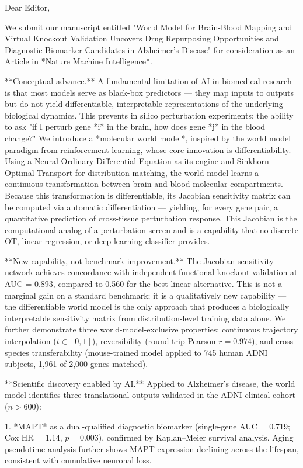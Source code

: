 Dear Editor,

We submit our manuscript entitled "World Model for Brain-Blood Mapping and Virtual Knockout Validation Uncovers Drug Repurposing Opportunities and Diagnostic Biomarker Candidates in Alzheimer's Disease" for consideration as an Article in *Nature Machine Intelligence*.

**Conceptual advance.** A fundamental limitation of AI in biomedical research is that most models serve as black-box predictors — they map inputs to outputs but do not yield differentiable, interpretable representations of the underlying biological dynamics. This prevents in silico perturbation experiments: the ability to ask "if I perturb gene *i* in the brain, how does gene *j* in the blood change?" We introduce a *molecular world model*, inspired by the world model paradigm from reinforcement learning, whose core innovation is differentiability. Using a Neural Ordinary Differential Equation as its engine and Sinkhorn Optimal Transport for distribution matching, the world model learns a continuous transformation between brain and blood molecular compartments. Because this transformation is differentiable, its Jacobian sensitivity matrix can be computed via automatic differentiation — yielding, for every gene pair, a quantitative prediction of cross-tissue perturbation response. This Jacobian is the computational analog of a perturbation screen and is a capability that no discrete OT, linear regression, or deep learning classifier provides.

**New capability, not benchmark improvement.** The Jacobian sensitivity network achieves concordance with independent functional knockout validation at AUC = 0.893, compared to 0.560 for the best linear alternative. This is not a marginal gain on a standard benchmark; it is a qualitatively new capability — the differentiable world model is the only approach that produces a biologically interpretable sensitivity matrix from distribution-level training data alone. We further demonstrate three world-model-exclusive properties: continuous trajectory interpolation ($t \in [0,1]$), reversibility (round-trip Pearson $r = 0.974$), and cross-species transferability (mouse-trained model applied to 745 human ADNI subjects, 1,961 of 2,000 genes matched).

**Scientific discovery enabled by AI.** Applied to Alzheimer's disease, the world model identifies three translational outputs validated in the ADNI clinical cohort ($n > 600$):

1. *MAPT* as a dual-qualified diagnostic biomarker (single-gene AUC = 0.719; Cox HR = 1.14, $p = 0.003$), confirmed by Kaplan–Meier survival analysis. Aging pseudotime analysis further shows MAPT expression declining across the lifespan, consistent with cumulative neuronal loss.

